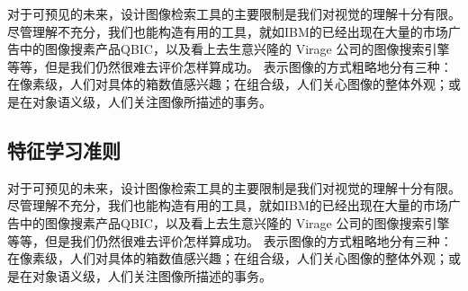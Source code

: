 对于可预见的未来，设计图像检索工具的主要限制是我们对视觉的理解十分有限。尽管理解不充分，我们也能构造有用的工具，就如IBM的已经出现在大量的市场广告中的图像搜素产品QBIC，以及看上去生意兴隆的
Virage 公司的图像搜索引擎等等，但是我们仍然很难去评价怎样算成功。
表示图像的方式粗略地分有三种：在像素级，人们对具体的箱数值感兴趣；在组合级，人们关心图像的整体外观；或是在对象语义级，人们关注图像所描述的事务。

\subsection{特征学习准则}

对于可预见的未来，设计图像检索工具的主要限制是我们对视觉的理解十分有限。尽管理解不充分，我们也能构造有用的工具，就如IBM的已经出现在大量的市场广告中的图像搜素产品QBIC，以及看上去生意兴隆的
Virage 公司的图像搜索引擎等等，但是我们仍然很难去评价怎样算成功。
表示图像的方式粗略地分有三种：在像素级，人们对具体的箱数值感兴趣；在组合级，人们关心图像的整体外观；或是在对象语义级，人们关注图像所描述的事务。